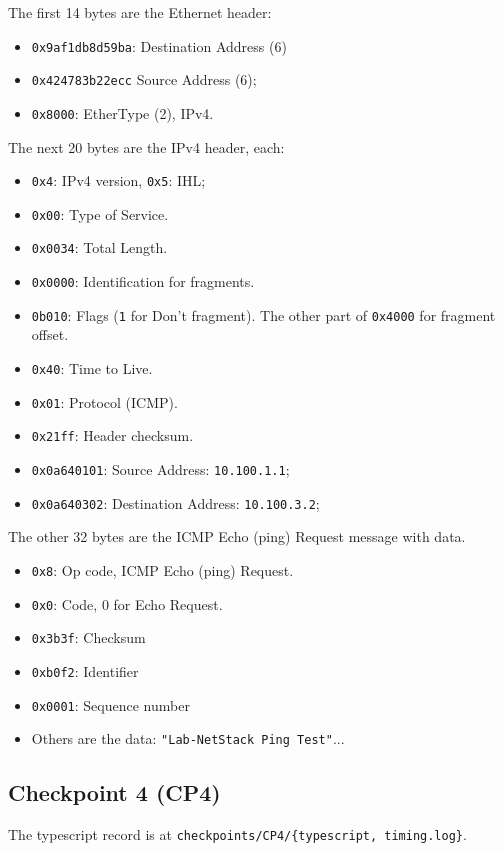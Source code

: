 \documentclass[a4paper]{article}
\begin{document}
  The first 14 bytes are the Ethernet header:
  \begin{itemize}
    \item \texttt{0x9af1db8d59ba}: Destination Address (6)
    \item \texttt{0x424783b22ecc} Source Address (6);
    \item \texttt{0x8000}: EtherType (2), IPv4.
  \end{itemize}
  The next 20 bytes are the IPv4 header, each:
  \begin{itemize}
    \item \texttt{0x4}: IPv4 version, \texttt{0x5}: IHL;
    \item \texttt{0x00}: Type of Service.
    \item \texttt{0x0034}: Total Length.
    \item \texttt{0x0000}: Identification for fragments.
    \item \texttt{0b010}: Flags (\texttt{1} for Don't fragment). The other part of \texttt{0x4000} for fragment offset.
    \item \texttt{0x40}: Time to Live.
    \item \texttt{0x01}: Protocol (ICMP).
    \item \texttt{0x21ff}: Header checksum.
    \item \texttt{0x0a640101}: Source Address: \texttt{10.100.1.1};
    \item \texttt{0x0a640302}: Destination Address: \texttt{10.100.3.2};
  \end{itemize}
  The other 32 bytes are the ICMP Echo (ping) Request message with data.
  \begin{itemize}
    \item \texttt{0x8}: Op code, ICMP Echo (ping) Request.
    \item \texttt{0x0}: Code, 0 for Echo Request.
    \item \texttt{0x3b3f}: Checksum 
    \item \texttt{0xb0f2}: Identifier
    \item \texttt{0x0001}: Sequence number
    \item Others are the data: \texttt{"Lab-NetStack Ping Test"}...
  \end{itemize}

  \subsection{Checkpoint 4 (CP4)}

  The typescript record is at \texttt{checkpoints/CP4/\{typescript, timing.log\}}.
\end{document}
